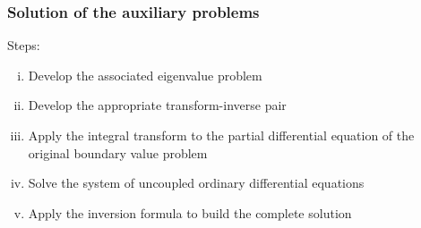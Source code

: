 \documentclass[aspectratio=169]{beamer}
\begin{document}
\begin{frame}
	\frametitle{Solution of the auxiliary problems}
	
	Steps:
	
	\begin{enumerate}[(i)]
		\item Develop the associated eigenvalue problem
		\item Develop the appropriate transform-inverse pair
		\item Apply the integral transform to the partial differential equation of the original boundary value problem
		\item Solve the system of uncoupled ordinary differential equations
		\item Apply the inversion formula to build the complete solution
	\end{enumerate}
\end{frame}
%
%			
%			
%			
%			
%			
\end{document}
